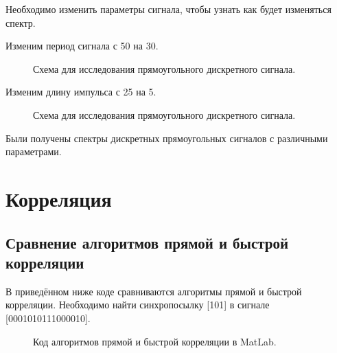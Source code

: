 \documentclass[a4paper,14pt]{extarticle}
\begin{document}
Необходимо изменить параметры сигнала, чтобы узнать как будет изменяться спектр.

Изменим период сигнала с 50 на 30.

\begin{figure}[H]
\caption{Схема для исследования прямоугольного дискретного сигнала.}
\label{017}
\end{figure}


Изменим длину импульса с 25 на 5.

\begin{figure}[H]
\caption{Схема для исследования прямоугольного дискретного сигнала.}
\label{018}
\end{figure}


Были получены спектры дискретных прямоугольных сигналов с различными параметрами.

\section{Корреляция}

\subsection{Сравнение алгоритмов прямой и быстрой корреляции}
В приведённом ниже коде сравниваются алгоритмы прямой и быстрой корреляции. Необходимо найти синхропосылку [101] в сигнале [0001010111000010].

\begin{figure}[H]
\caption{Код алгоритмов прямой и быстрой корреляции в MatLab.}
\label{019}
\end{figure}
\end{document}
